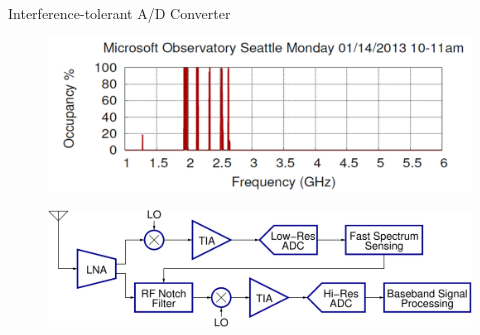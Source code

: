 %				
%				
	\begin{frame}{Interference-tolerant A/D Converter}
		
		
		\begin{figure}[t]
			\centering
			\includegraphics[width=3.5 in]{./Figures/spectrumsensing}
		\end{figure}
		\begin{figure}[t]
			\centering
			\includegraphics[width=3.5 in]{./Figures/systemdiagram}
		\end{figure}
	\end{frame}
%		
%		

